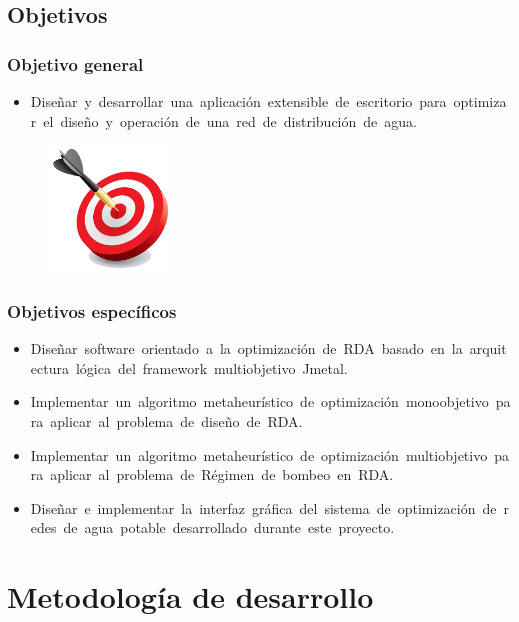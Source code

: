 \documentclass[9pt]{beamer}
\begin{document}
    \subsection{Objetivos}
    \begin{frame}
        \frametitle{Objetivo general}
        
        \begin{itemize}
            \item Diseñar y desarrollar una aplicación extensible de escritorio para optimizar el diseño y operación de una red de distribución de agua.
        \end{itemize}

        \begin{figure}
            \includegraphics[width=0.3\textwidth]{assets/Relleno/objetivo.png}
        \end{figure}

    \end{frame}

    \begin{frame}
        \frametitle{Objetivos específicos}
        \begin{itemize}
            \item Diseñar software orientado a la optimización de RDA basado en la arquitectura lógica del framework multiobjetivo Jmetal.
            \item Implementar un algoritmo metaheurístico de optimización monoobjetivo para aplicar al problema de diseño de RDA.
            \item Implementar un algoritmo metaheurístico de optimización multiobjetivo para aplicar al problema de Régimen de bombeo en RDA.
            \item Diseñar e implementar la interfaz gráfica del sistema de optimización de redes de agua potable desarrollado durante este proyecto.
        \end{itemize}
    \end{frame}

    \section{Metodología de desarrollo}
\end{document}
